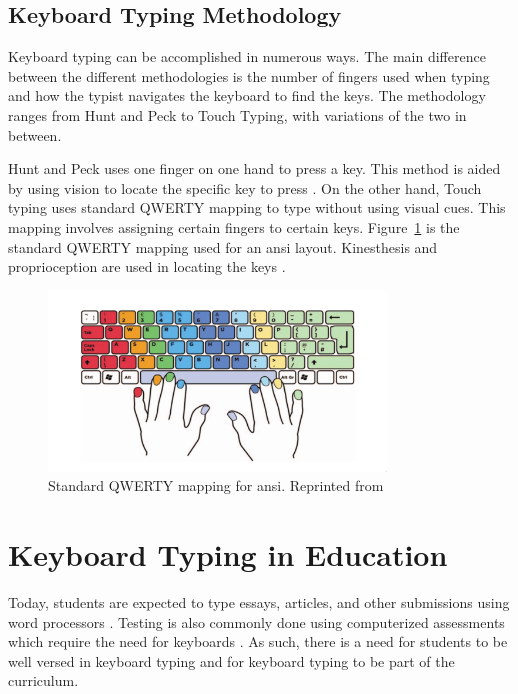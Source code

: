 \documentclass{report}
\begin{document}
\subsection{Keyboard Typing Methodology}
Keyboard typing can be accomplished in numerous ways. The main difference
between the different methodologies is the number of fingers used when typing
and how the typist navigates the keyboard to find the keys. The methodology
ranges from Hunt and Peck to Touch Typing, with variations of the two in
between.

Hunt and Peck uses one finger on one hand to press a key. This method is aided
by using vision to locate the specific key to press \parencite{hoot1986}. On the
other hand, Touch typing uses standard QWERTY mapping to type without using
visual cues. \parencite{dobson2009touch} This mapping involves assigning certain
fingers to certain keys. Figure~\ref{fig:touch-type} is the standard QWERTY
mapping used for an \ac{ansi} layout. Kinesthesis and proprioception are used in
locating the keys \parencite{logan2016}.

\begin{figure}[H]
	\centering
	\includegraphics[width=0.8\textwidth]{touch-type.png}
	\caption{Standard QWERTY mapping for \ac{ansi}. Reprinted from }
	\label{fig:touch-type}
	\centering
\end{figure}


\section{Keyboard Typing in Education}

Today, students are expected to type essays, articles, and other submissions
using word processors \parencite{poole2016}. Testing is also commonly done using
computerized assessments which require the need for keyboards
\parencite{moodle}. As such, there is a need for students to be well versed in
keyboard typing and for keyboard typing to be part of the curriculum.
\end{document}
